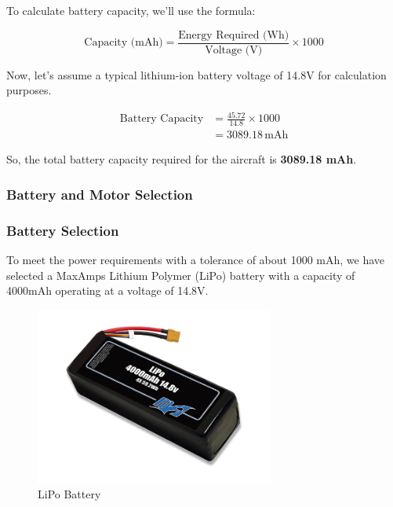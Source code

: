 \documentclass[12 pt]{article}
\begin{document}
To calculate battery capacity, we'll use the formula:

\[
\text{Capacity (mAh)} = \frac{\text{Energy Required (Wh)}}{\text{Voltage (V)}} \times 1000
\]


Now, let's assume a typical lithium-ion battery voltage of 14.8V for calculation purposes.

\begin{align}
\text{Battery Capacity} &= \frac{45.72}{14.8} \times 1000 \\
& = 3089.18 \, \text{mAh}
\end{align}

So, the total battery capacity required for the aircraft is \textbf{3089.18 mAh}.

\subsubsection{{Battery and Motor Selection}}

\subsubsection{{Battery Selection}}

To meet the power requirements with a tolerance of about 1000 mAh, we have selected a MaxAmps Lithium Polymer (LiPo) battery with a capacity of 4000mAh operating at a voltage of 14.8V.

\begin{figure}[h]
    \centering
    \includegraphics[width=0.7\textwidth]{LiPo-4000-4S-14.8v-Battery-Pack.jpg}
    \caption{LiPo Battery}
    \label{fig:battery}
\end{figure}
\end{document}
